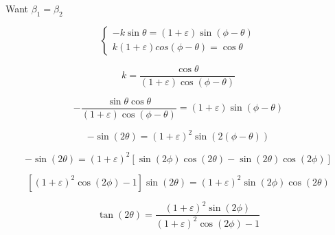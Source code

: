 \documentclass{article}
\begin{document}
Want $\beta_1 = \beta_2$

\begin{equation}
	\begin{cases}
		-k\sin\theta=(1+\varepsilon)\sin(\phi-\theta)\\
		k(1+\varepsilon)cos(\phi-\theta)=\cos\theta
	\end{cases}
\end{equation}

\begin{equation}
	k = \frac{\cos\theta}{(1+\varepsilon)\cos(\phi-\theta)}
\end{equation}

\begin{equation}
	-\frac{\sin\theta\cos\theta}{(1+\varepsilon)\cos(\phi-\theta)}=(1+\varepsilon)\sin(\phi-\theta)
\end{equation}

\begin{equation}
	-\sin(2\theta)=(1+\varepsilon)^2\sin(2(\phi-\theta))
\end{equation}

\begin{equation}
	-\sin(2\theta)=(1+\varepsilon)^2\left[\sin(2\phi)\cos(2\theta) - \sin(2\theta)\cos(2\phi)\right]
\end{equation}

\begin{equation}
	\left[(1+\varepsilon)^2\cos(2\phi)-1\right]\sin(2\theta)=(1+\varepsilon)^2\sin(2\phi)\cos(2\theta)
\end{equation}

\begin{equation}
	\tan(2\theta)=\frac{(1+\varepsilon)^2\sin(2\phi)}{(1+\varepsilon)^2\cos(2\phi)-1}
\end{equation}
\end{document}
